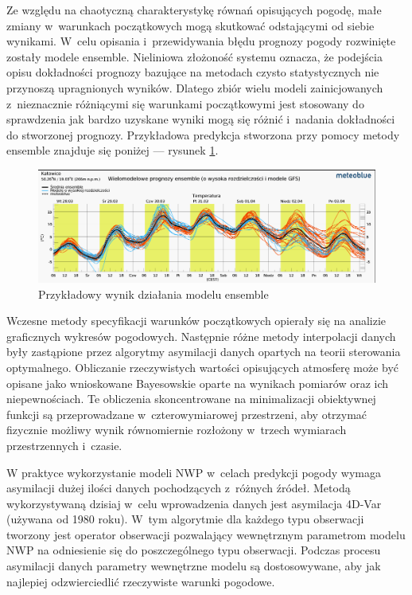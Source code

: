 
Ze względu na chaotyczną charakterystykę równań opisujących pogodę, małe zmiany w~warunkach początkowych
mogą skutkować odstającymi od siebie wynikami. W~celu opisania i~przewidywania błędu prognozy pogody 
rozwinięte zostały modele ensemble. Nieliniowa złożoność systemu oznacza, że podejścia opisu
dokładności prognozy bazujące na metodach czysto statystycznych nie przynoszą upragnionych wyników.
Dlatego zbiór wielu modeli zainicjowanych z~nieznacznie różniącymi się warunkami początkowymi
jest stosowany do sprawdzenia jak bardzo uzyskane wyniki mogą się różnić i~nadania dokładności do 
stworzonej prognozy. Przykładowa predykcja stworzona przy pomocy metody ensemble znajduje się 
poniżej — rysunek \ref{nwp-ensemble}.

\begin{figure}[H]
    \centering
    \includegraphics[width=\textwidth]{images/multimodel.png}
    \caption[ensemble]{Przykładowy wynik działania modelu ensemble\footnotemark}
    \label{nwp-ensemble}
\end{figure}

Wczesne metody specyfikacji warunków początkowych opierały się na analizie graficznych wykresów 
pogodowych. Następnie różne metody interpolacji danych były zastąpione przez algorytmy
asymilacji danych opartych na teorii sterowania optymalnego. Obliczanie rzeczywistych wartości
opisujących atmosferę może być opisane jako wnioskowane Bayesowskie oparte na wynikach pomiarów
oraz ich niepewnościach. Te obliczenia skoncentrowane na minimalizacji obiektywnej funkcji 
są przeprowadzane w~czterowymiarowej przestrzeni, aby otrzymać fizycznie możliwy wynik
równomiernie rozłożony w~trzech wymiarach przestrzennych i~czasie.

W praktyce wykorzystanie modeli NWP w~celach predykcji pogody wymaga asymilacji dużej ilości
danych pochodzących z~różnych źródeł. Metodą wykorzystywaną dzisiaj w~celu wprowadzenia
danych jest asymilacja 4D-Var (używana od 1980 roku). W~tym algorytmie dla każdego typu obserwacji tworzony jest
operator obserwacji pozwalający wewnętrznym parametrom modelu NWP na odniesienie się
do poszczególnego typu obserwacji. Podczas procesu asymilacji danych parametry wewnętrzne
modelu są dostosowywane, aby jak najlepiej odzwierciedlić rzeczywiste warunki pogodowe.

